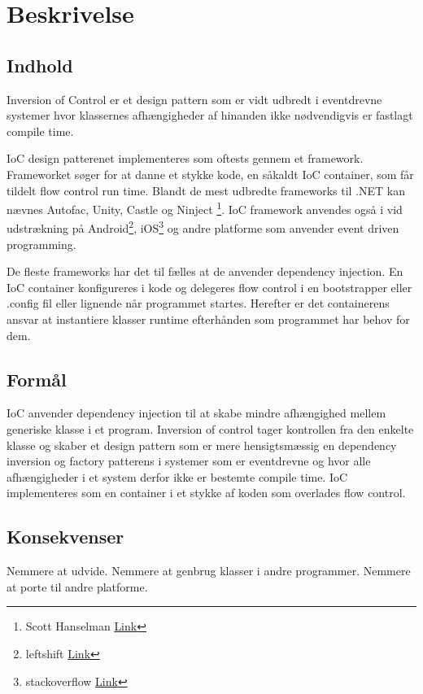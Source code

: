 \thispagestyle{fancy}
\chapter{Beskrivelse}
\label{chp:description}

\section{Indhold}
Inversion of Control er et design pattern som er vidt udbredt i eventdrevne systemer hvor klassernes afhængigheder af hinanden ikke nødvendigvis er fastlagt compile time. 

IoC design patterenet implementeres som oftests gennem et framework. Frameworket søger for at danne et stykke kode, en såkaldt IoC container, som får tildelt flow control run time. Blandt de mest udbredte frameworks til .NET kan nævnes Autofac, Unity, Castle og Ninject \footnote{Scott Hanselman \href{http://www.hanselman.com/blog/ListOfNETDependencyInjectionContainersIOC.aspx}{Link}}. IoC framework anvendes også i vid udstrækning på Android\footnote{leftshift \href{http://leftshift.io/android-inversion-of-control-dependency-injection-dagger-part-1}{Link}}, iOS\footnote{stackoverflow \href{http://stackoverflow.com/questions/8782398/recommended-ioc-framework-for-ios}{Link}} og andre platforme som anvender event driven programming.

De fleste frameworks har det til fælles at de anvender dependency injection. En IoC container konfigureres i kode og delegeres flow control i en bootstrapper eller .config fil eller lignende når programmet startes. Herefter er det containerens ansvar at instantiere klasser runtime efterhånden som programmet har behov for dem. 

\section{Formål}
IoC anvender dependency injection til at skabe mindre afhængighed mellem generiske klasse i et program. Inversion of control tager kontrollen fra den enkelte klasse og skaber et design pattern som er mere hensigtsmæssig en dependency inversion og factory patterens i systemer som er eventdrevne og hvor alle afhængigheder i et system derfor ikke er bestemte compile time. IoC implementeres som en container i et stykke af koden som overlades flow control.

\section{Konsekvenser}
Nemmere at udvide. Nemmere at genbrug klasser i andre programmer. Nemmere at porte til andre platforme.
